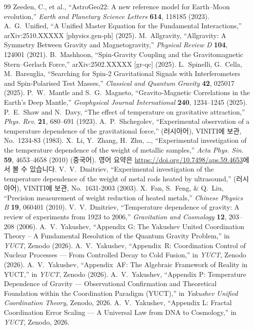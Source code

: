 \documentclass[11pt,a4paper]{article}
\begin{document}
\begin{thebibliography}{99}
		 Zeeden, C., et al., ``AstroGeo22: A new reference model for Earth–Moon evolution,'' \emph{Earth and Planetary Science Letters} \textbf{614}, 118185 (2023).
		A.~G.~Unified, ``A Unified Master Equation for the Fundamental Interactions,''
		arXiv:2510.XXXXX [physics.gen-ph] (2025).
		M.~Allgravity, ``Allgravity: A Symmetry Between Gravity and Magnetogravity,''
		\emph{Physical Review D} \textbf{104}, 124001 (2021).
		B.~Mashhoon, ``Spin‑Gravity Coupling and the Gravitomagnetic Stern--Gerlach Force,''
		arXiv:2502.XXXXX [gr-qc] (2025).
		L.~Spinelli, G.~Cella, M.~Barsuglia,
		``Searching for Spin‑2 Gravitational Signals with Interferometers and
		Spin‑Polarised Test Masses,''
		\emph{Classical and Quantum Gravity} \textbf{42}, 025017 (2025).
		P.~W.~Mantle and S.~G.~Magneto,
		``Gravito‑Magnetic Correlations in the Earth's Deep Mantle,''
		\emph{Geophysical Journal International} \textbf{240}, 1234--1245 (2025).
		P.~E.~Shaw and N.~Davy, ``The effect of temperature on gravitative attraction,'' \emph{Phys. Rev.} \textbf{21}, 680–691 (1923).
		A.~P.~Shchegolev, ``Experimental observation of a temperature dependence of the gravitational force,'' (러시아어), VINITI에 보관, No.~1234-83 (1983).
		X.~Li, Y.~Zhang, H.~Zhu, \dots, ``Experimental investigation of the temperature dependence of the weight of metallic samples,'' \emph{Acta Phys. Sin.} \textbf{59}, 4653–4658 (2010) (중국어). 영어 요약은 \url{https://doi.org/10.7498/aps.59.4653}에서 볼 수 있습니다.
		V.~V.~Dmitriev, ``Experimental investigation of the temperature dependence of the weight of metal rods heated by ultrasound,'' (러시아어), VINITI에 보관, No.~1631-2003 (2003).
		X.~Fan, S.~Feng, \& Q.~Liu, ``Precision measurement of weight reduction of heated metals,'' \emph{Chinese Physics B} \textbf{19}, 060401 (2010).
		V.~V.~Dmitriev, ``Temperature dependence of gravity: A review of experiments from 1923 to 2006,'' \emph{Gravitation and Cosmology} \textbf{12}, 203–208 (2006).
		A.~V.~Yakushev, ``Appendix G: The Yakushev United Coordination Theory -- A
		Fundamental Resolution of the Quantum Gravity Problem,''
		in \emph{YUCT}, Zenodo (2026).
		A.~V.~Yakushev, ``Appendix~R: Coordination Control of Nuclear Processes ---
		From Controlled Decay to Cold Fusion,''
		in \emph{YUCT}, Zenodo (2026).
		A.~V.~Yakushev, ``Appendix~AF: The Algebraic Framework of Reality in YUCT,''
		in \emph{YUCT}, Zenodo (2026).
		A.~V.~Yakushev, ``Appendix P: Temperature Dependence of Gravity — Observational Confirmation and Theoretical Foundation within the Coordination Paradigm (YUCT),'' in \emph{Yakushev Unified Coordination Theory}, Zenodo, 2026.
		A.~V.~Yakushev, ``Appendix L: Fractal Coordination Error Scaling — A Universal Law from DNA to Cosmology,'' in \emph{YUCT}, Zenodo, 2026.
	\end{thebibliography}
	
\end{document}
